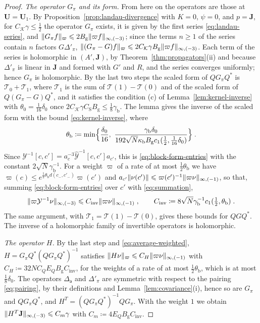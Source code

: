 \documentclass[11pt]{preprint}
\DeclarePairedDelimiter{\norm}{\lVert}{\rVert}
\numberwithin{equation}{section}
\begin{document}
\begin{proof}
\emph{The operator $G_\pi$ and its form.} From here on the operators are those at $\mathbf U = \mathbf U_1$. By Proposition~\ref{prop:landau-divergence} with $K = 0$, $\psi = 0$, and $p = \mathbf J$, for $C_{\mathcal K}\gamma \leqslant \frac{1}{2}$ the operator $G_\pi$ exists, it is given by the first series \eqref{eq:landau-series}, and $\norm{G_\pi f}_\varpi \leqslant 2B_{\mathrm g}\norm{\varpi f}_{\infty,(-3)}$; since the terms $n \geqslant 1$ of the series contain $n$ factors $G\Delta'_\pi$, $\norm{(G_\pi - G)f}_\varpi \leqslant 2C_{\mathcal K}\gamma B_{\mathrm g}\norm{\varpi f}_{\infty,(-3)}$. Each term of the series is holomorphic in $(A', \mathbf J)$, by Theorem~\ref{thm:propagators}(ii) and because $\Delta'_\pi$ is linear in $\mathbf J$ and formed with $G'$ and $R$, and the series converges uniformly; hence $G_\pi$ is holomorphic. By the last two steps the scaled form of $QG_\pi Q^*$ is $\mathcal T_0 + \mathcal T_1$, where $\mathcal T_1$ is the sum of $\mathcal T(1) - \mathcal T(0)$ and of the scaled form of $Q(G_\pi - G)Q^*$, and it satisfies the condition (c) of Lemma~\ref{lem:kernel-inverse} with $\theta_0 = \frac{1}{16}\delta_0$ once $2C_{\mathcal K}\gamma C_{\mathrm S}B_{\mathrm g} \leqslant \frac{1}{8}\gamma_{\mathrm b}$. The lemma gives the inverse of the scaled form with the bound \eqref{eq:kernel-inverse}, where
\[
    \theta_{\mathrm b} \coloneqq \min\Bigl\{ \frac{\delta_0}{16},\ \frac{\gamma_{\mathrm b}\delta_0}{192\sqrt N\kappa_{\mathrm b}B_{\mathrm g}c_1(\frac{1}{2}, \frac{1}{16}\delta_0)} \Bigr\}\;.
\]
Since $\mathcal Y^{-1}[c, c'] = a_c^{-3}\hat{\mathcal Y}^{-1}[c, c']a_{c'}$, this is \eqref{eq:block-form-entries} with the constant $2\sqrt N\gamma_{\mathrm b}^{-1}$. For a weight $\varpi$ of a rate of at most $\frac{1}{2}\theta_{\mathrm b}$ we have $\varpi(c) \leqslant e^{\frac{1}{2}\theta_{\mathrm b}d(c_-, c'_-)}\varpi(c')$ and $a_{c'}\norm{\nu(c')} \leqslant \varpi(c')^{-1}\norm{\varpi\nu}_{\infty,(-1)}$, so that, summing \eqref{eq:block-form-entries} over $c'$ with \eqref{eq:summation},
\[
    \norm{\varpi\mathcal Y^{-1}\nu}_{\infty,(-3)} \leqslant C_{\mathrm{inv}}\norm{\varpi\nu}_{\infty,(-1)}\;,
    \qquad
    C_{\mathrm{inv}} \coloneqq 8\sqrt N\gamma_{\mathrm b}^{-1}c_1(\tfrac{1}{2}, \theta_{\mathrm b})\;.
\]
The same argument, with $\mathcal T_1 = \mathcal T(1) - \mathcal T(0)$, gives these bounds for $QGQ^*$. The inverse of a holomorphic family of invertible operators is holomorphic.

\emph{The operator $H$.} By the last step and \eqref{eq:average-weighted}, $H = G_\pi Q^*(QG_\pi Q^*)^{-1}$ satisfies $\norm{H\nu}_\varpi \leqslant C_H\norm{\varpi\nu}_{\infty,(-1)}$ with $C_H \coloneqq 32NC_QE_QB_{\mathrm g}C_{\mathrm{inv}}$, for the weights of a rate of at most $\frac{1}{2}\theta_{\mathrm b}$, which is at most $\frac{1}{8}\delta_0$. The operators $\Delta_{\mathsf a}$ and $\Delta'_\pi$ are symmetric with respect to the pairing \eqref{eq:pairing}, by their definitions and Lemma~\ref{lem:covariance}(i), hence so are $G_\pi$ and $QG_\pi Q^*$, and $H^T = (QG_\pi Q^*)^{-1}QG_\pi$. With the weight $1$ we obtain $\norm{H^T\mathbf J}_{\infty,(-3)} \leqslant C_m\gamma$ with $C_m \coloneqq 4E_QB_{\mathrm g}C_{\mathrm{inv}}$.


\end{proof}
\end{document}
